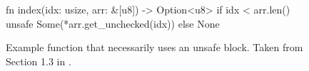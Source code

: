 \begin{figure}[h]
    \centering
    \begin{boxedverbatim}

fn index(idx: usize, arr: &[u8]) -> Option<u8> {
    if idx < arr.len() {
        unsafe { Some(*arr.get_unchecked(idx)) }
    } else {
        None
    }
}
    \end{boxedverbatim}
    \caption[Example usage of an unsafe block in Rust]{Example function that
    necessarily uses an unsafe block. Taken from Section 1.3 in
    \cite{rust-nomicon}.}
    \label{fig:rust-unsafe-block}
\end{figure}
